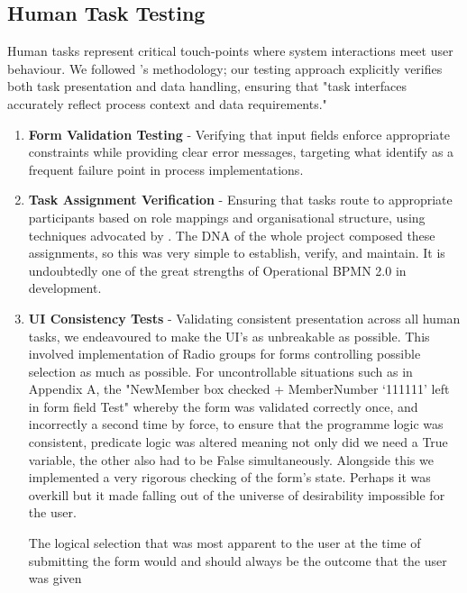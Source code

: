 \documentclass[14pt,a4paper]{article}
\begin{document}
\subsection{Human Task Testing}

Human tasks represent critical touch-points where system interactions meet user behaviour. We followed \textit{\parencite[p. 217]{Martinho2015}}'s methodology; our testing approach explicitly verifies both task presentation and data handling, ensuring that "task interfaces accurately reflect process context and data requirements."

\begin{enumerate}
    \item \textbf{Form Validation Testing} - Verifying that input fields enforce appropriate constraints while providing clear error messages, targeting what \textit{\parencite[p. 124]{Grossmann2008}} identify as a frequent failure point in process implementations.

    \item \textbf{Task Assignment Verification} - Ensuring that tasks route to appropriate participants based on role mappings and organisational structure, using techniques advocated by \textit{\parencite[p. 186]{Bozkurt2013}}. The DNA of the whole project composed these assignments, so this was very simple to establish, verify, and maintain. It is undoubtedly one of the great strengths of Operational BPMN 2.0 in development.

    \item \textbf{UI Consistency Tests} - Validating consistent presentation across all human tasks, we endeavoured to make the UI's as unbreakable as possible. This involved implementation of Radio groups for forms controlling possible selection as much as possible. For uncontrollable situations such as in Appendix A, the "NewMember box checked + MemberNumber ‘111111’ left in form field Test" whereby the form was validated correctly once, and incorrectly a second time by force, to ensure that the programme logic was consistent, predicate logic was altered meaning not only did we need a True variable, the other also had to be False simultaneously. Alongside this we implemented a very rigorous checking of the form's state. Perhaps it was overkill but it made falling out of the universe of desirability impossible for the user.

The logical selection that was most apparent to the user at the time of submitting the form would and should always be the outcome that the user was given
\end{enumerate}
\end{document}
